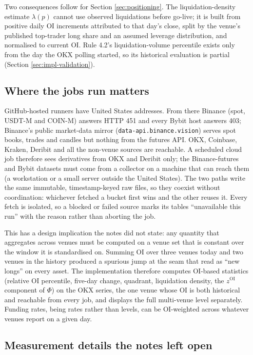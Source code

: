 \documentclass[11pt,a4paper]{article}
\theoremstyle{definition}
\begin{document}
Two consequences follow for Section \ref{sec:positioning}. The liquidation-density estimate $\lambda(p)$ cannot use observed liquidations before go-live; it is built from positive daily OI increments attributed to that day's close, split by the venue's published top-trader long share and an assumed leverage distribution, and normalised to current OI. Rule 4.2's liquidation-volume percentile exists only from the day the OKX polling started, so its historical evaluation is partial (Section \ref{sec:impl-validation}).

\subsection{Where the jobs run matters}

GitHub-hosted runners have United States addresses. From there Binance (spot, USDT-M and COIN-M) answers HTTP 451 and every Bybit host answers 403; Binance's public market-data mirror (\texttt{data-api.binance.vision}) serves spot books, trades and candles but nothing from the futures API. OKX, Coinbase, Kraken, Deribit and all the non-venue sources are reachable. A scheduled cloud job therefore sees derivatives from OKX and Deribit only; the Binance-futures and Bybit datasets must come from a collector on a machine that can reach them (a workstation or a small server outside the United States). The two paths write the same immutable, timestamp-keyed raw files, so they coexist without coordination: whichever fetched a bucket first wins and the other reuses it. Every fetch is isolated, so a blocked or failed source marks its tables ``unavailable this run'' with the reason rather than aborting the job.

This has a design implication the notes did not state: any quantity that aggregates across venues must be computed on a venue set that is constant over the window it is standardised on. Summing OI over three venues today and two venues in the history produced a spurious jump at the seam that read as ``new longs'' on every asset. The implementation therefore computes OI-based statistics (relative OI percentile, five-day change, quadrant, liquidation density, the $z^{\mathrm{OI}}$ component of $\Phi$) on the OKX series, the one venue whose OI is both historical and reachable from every job, and displays the full multi-venue level separately. Funding rates, being rates rather than levels, can be OI-weighted across whatever venues report on a given day.

\subsection{Measurement details the notes left open}
\end{document}
